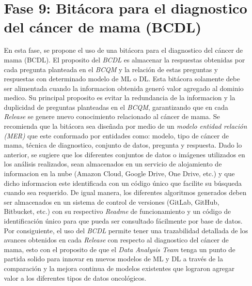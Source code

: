 \section{Fase 9: Bitácora para el diagnostico del cáncer de mama (BCDL) }
En esta fase, se propone el uso de una bitácora para el diagnostico del cáncer de mama (BCDL). El proposito del \textit{BCDL} es almacenar la respuestas obtenidas por cada pregunta planteada en el \textit{BCQM} y la relación de estas preguntas y respuestas con determinado modelo de ML o DL. Esta bitácora solamente debe ser alimentada cuando la informacion obtenida generó valor agregado al dominio medico. Su principal proposito es evitar la redundancia de la informacion y la duplicidad de preguntas planteadas en el \textit{BCQM}, garantizando que en cada \textit{Release} se genere nuevo conocimiento relacionado al cáncer de mama. Se recomienda que la bitácora sea diseñada por medio de un \textit{modelo entidad relación (MER)} que este conformado por entidades como: modelo, tipo de cáncer de mama, técnica de diagnostico, conjunto de datos, pregunta y respuesta. Dado lo anterior, se sugiere que  los diferentes conjuntos de datos o imágenes utilizados en los análisis realizados, sean almacenados en un servicio de alojamiento de informacion en la nube (Amazon Cloud, Google Drive, One Drive, etc.) y que dicho informacion este identificada con un código único que facilite su búsqueda cuando sea requerido. De igual manera, los diferentes algoritmos generados deben ser almacenados en un sistema de control de versiones (GitLab, GitHub, Bitbucket, etc.) con su respectivo \textit{Readme} de funcionamiento y un código de identificación único para que pueda ser consultado fácilmente por base de datos. Por consiguiente, el uso del \textit{BCDL} permite tener una trazabilidad detallada de los avances obtenidos en cada \textit{Release} con respecto al diagnostico del cáncer de mama, esto con el proposito de que el \textit{Data Analysis Team} tenga un punto de partida solido para innovar en nuevos modelos de ML y DL a través de la comparación  y la mejora continua de modelos existentes que lograron agregar valor a los diferentes tipos de datos oncológicos.


